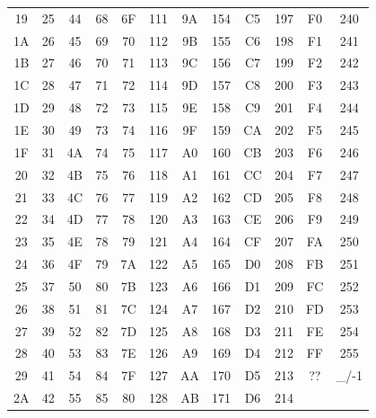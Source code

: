\documentclass[11pt,a4paper]{book}
\begin{document}
\begin{longtable}{|c|c||c|c||c|c||c|c||c|c||c|c|}
19 & 25 & 44 & 68 & 6F & 111 & 9A & 154 & C5 & 197 & F0 & 240 \\
1A & 26 & 45 & 69 & 70 & 112 & 9B & 155 & C6 & 198 & F1 & 241 \\
1B & 27 & 46 & 70 & 71 & 113 & 9C & 156 & C7 & 199 & F2 & 242 \\
1C & 28 & 47 & 71 & 72 & 114 & 9D & 157 & C8 & 200 & F3 & 243 \\
1D & 29 & 48 & 72 & 73 & 115 & 9E & 158 & C9 & 201 & F4 & 244 \\
1E & 30 & 49 & 73 & 74 & 116 & 9F & 159 & CA & 202 & F5 & 245 \\
1F & 31 & 4A & 74 & 75 & 117 & A0 & 160 & CB & 203 & F6 & 246 \\
20 & 32 & 4B & 75 & 76 & 118 & A1 & 161 & CC & 204 & F7 & 247 \\
21 & 33 & 4C & 76 & 77 & 119 & A2 & 162 & CD & 205 & F8 & 248 \\
22 & 34 & 4D & 77 & 78 & 120 & A3 & 163 & CE & 206 & F9 & 249 \\
23 & 35 & 4E & 78 & 79 & 121 & A4 & 164 & CF & 207 & FA & 250 \\
24 & 36 & 4F & 79 & 7A & 122 & A5 & 165 & D0 & 208 & FB & 251 \\
25 & 37 & 50 & 80 & 7B & 123 & A6 & 166 & D1 & 209 & FC & 252 \\
26 & 38 & 51 & 81 & 7C & 124 & A7 & 167 & D2 & 210 & FD & 253 \\
27 & 39 & 52 & 82 & 7D & 125 & A8 & 168 & D3 & 211 & FE & 254 \\
28 & 40 & 53 & 83 & 7E & 126 & A9 & 169 & D4 & 212 & FF & 255 \\
29 & 41 & 54 & 84 & 7F & 127 & AA & 170 & D5 & 213 & ?? & \_/-1 \\
2A & 42 & 55 & 85 & 80 & 128 & AB & 171 & D6 & 214 & & \\
\end{longtable}
\end{document}
